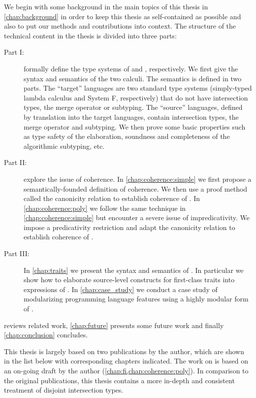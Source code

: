 We begin with some background in the main topics of this thesis in
\cref{chap:background} in order to keep this thesis as self-contained as
possible and also to put our methods and contributions into context. The
structure of the technical content in the thesis is divided into three parts:
\begin{description}
\item[Part I:]  formally define the type systems of
  \namee and \fnamee, respectively. We first give the syntax and semantics of
  the two calculi. The semantics is defined in two parts. The ``target''
  languages are two standard type systems (simply-typed lambda calculus and
  System F, respectively) that do not have intersection types, the merge
  operator or subtyping. The ``source'' languages, defined by translation into
  the target languages, contain intersection types, the merge operator and
  subtyping. We then prove some basic properties such as type safety of
  the elaboration, soundness and completeness of the algorithmic subtyping, etc.
\item[Part II:]  explore the
  issue of coherence. In \cref{chap:coherence:simple} we first propose a
  semantically-founded definition of coherence. We then use a proof method
  called the canonicity relation to establish coherence of \namee. In
  \cref{chap:coherence:poly} we follow the same technique in
  \cref{chap:coherence:simple} but encounter a severe issue of impredicativity.
  We impose a predicativity restriction and adapt the canonicity relation to
  establish coherence of \fnamee.
\item[Part III:] In \cref{chap:traits} we present the syntax and semantics of
  \sedel. In particular we show how to elaborate source-level constructs for
  first-class traits into expressions of \fnamee. In \cref{chap:case_study} we
  conduct a case study of modularizing programming language features using a
  highly modular form of \visitor.
\end{description}
 reviews related work, \cref{chap:future} presents some future
work and finally \cref{chap:conclusion} concludes.

This thesis is largely based on two publications by the author, which are shown
in the list below with corresponding chapters indicated. The work on \fnamee is
based on an on-going draft by the author (\cref{chap:fi,chap:coherence:poly}).
In comparison to the original publications, this thesis contains a more in-depth
and consistent treatment of disjoint intersection types.

